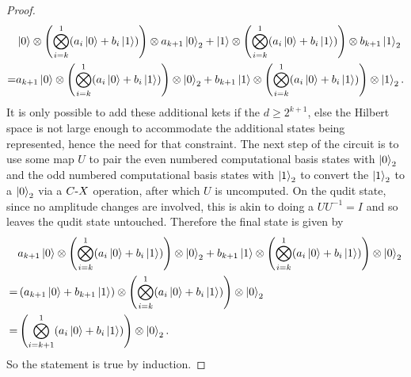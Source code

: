 \begin{appendices}
\begin{proof}
    \begin{align}
        &\ket{0} \otimes \left(\bigotimes_{i = k}^{1}(a_i\ket{0} + b_i\ket{1})\right)\otimes a_{k+1}\ket{0}_2
        +
        \ket{1} \otimes \left(\bigotimes_{i = k}^{1}(a_i\ket{0} + b_i\ket{1})\right)\otimes b_{k+1}\ket{1}_2\\
        =&a_{k+1}\ket{0} \otimes \left(\bigotimes_{i = k}^{1}(a_i\ket{0} + b_i\ket{1})\right)\otimes \ket{0}_2
        +
        b_{k+1} \ket{1} \otimes \left(\bigotimes_{i = k}^{1}(a_i\ket{0} + b_i\ket{1})\right)\otimes \ket{1}_2.
    \end{align}
    It is only possible to add these additional kets if the $d \geq 2^{k+1}$, else the Hilbert space is not large enough to accommodate the additional states being represented, hence the need for that constraint.
    The next step of the circuit is to use some map $U$ to pair the even numbered computational basis states with $\ket{0}_2$ and the odd numbered computational basis states with $\ket{1}_2$ to convert the $\ket{1}_2$ to a $\ket{0}_2$ via a $C\text{-}X$ operation, after which $U$ is uncomputed.
    On the qudit state, since no amplitude changes are involved, this is akin to doing a $UU^{-1}=I$ and so leaves the qudit state untouched.
    Therefore the final state is given by
    \begin{align}
        &a_{k+1}\ket{0} \otimes \left(\bigotimes_{i = k}^{1}(a_i\ket{0} + b_i\ket{1})\right)\otimes \ket{0}_2
        +
        b_{k+1} \ket{1} \otimes \left(\bigotimes_{i = k}^{1}(a_i\ket{0} + b_i\ket{1})\right)\otimes \ket{0}_2\\
        =&\left(a_{k+1}\ket{0}+b_{k+1} \ket{1}\right) \otimes \left(\bigotimes_{i = k}^{1}(a_i\ket{0} + b_i\ket{1})\right)\otimes \ket{0}_2\\
        =&\left(\bigotimes_{i = k+1}^{1}(a_i\ket{0} + b_i\ket{1})\right)\otimes \ket{0}_2.
    \end{align}
    So the statement is true by induction.
\end{proof}
\end{appendices}